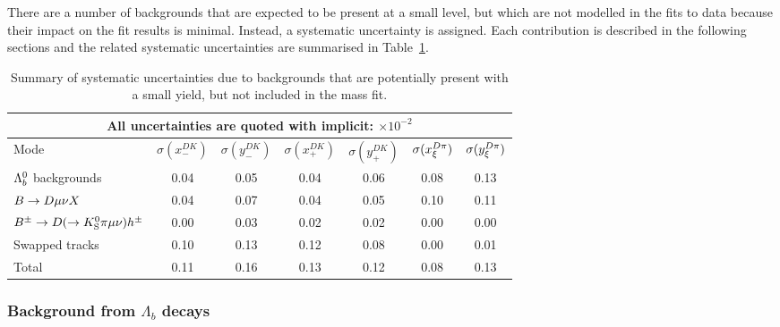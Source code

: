 There are a number of backgrounds that are expected to be present at a small level, but which are not modelled in the fits to data because their impact on the fit results is minimal. Instead, a systematic uncertainty is assigned. Each contribution is described in the following sections and the related systematic uncertainties are summarised in Table~\ref{tab:small_backgrounds}.

\begin{table}
    \centering
    \footnotesize
    \caption{Summary of systematic uncertainties due to backgrounds that are potentially present with a small yield, but not included in the mass fit.
    \label{tab:small_backgrounds}}
\begin{tabular}{l|cccccc}
\toprule
\multicolumn{7}{c}{All uncertainties are quoted with implicit: $\times 10^{-2}$} \\
\midrule
Mode & 
$\sigma(x_-^{DK})$ & $\sigma(y_-^{DK})$ & 
$\sigma(x_+^{DK})$ & $\sigma(y_+^{DK})$ &
$\sigma(x_\xi^{{D}\pi})$ & $\sigma(y_\xi^{{D}\pi})$ \\
\midrule
${{\Lambda}^0_{b}}$ backgrounds                        & 0.04  & 0.05  & 0.04  & 0.06  & 0.08  & 0.13  \\ 
${B}\rightarrow{\ensuremath{D}}\mu\nu X$                        & 0.04  & 0.07  & 0.04  & 0.05  & 0.10  & 0.11  \\ 
${{B}^\pm}\rightarrow{\ensuremath{D}}(\rightarrow {\ensuremath{{K}^0_{\mathrm{S}}}} \pi \mu \nu) h^\pm$   & 0.00  & 0.03  & 0.02  & 0.02  & 0.00  & 0.00  \\ 
Swapped tracks                           & 0.10  & 0.13  & 0.12  & 0.08  & 0.00  & 0.01  \\ 
\midrule
Total                                    & 0.11  & 0.16  & 0.13  & 0.12  & 0.08  & 0.13  \\ 

\bottomrule
\end{tabular}

\end{table}


\subsubsection{\texorpdfstring{Background from $\Lambda_b$ decays}{Background from Lb decays} } 
\label{sub:background_from_lambda_b_decays}

